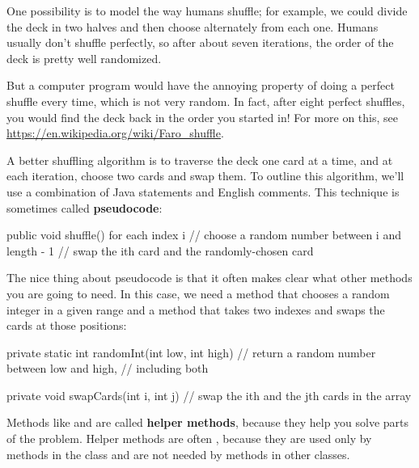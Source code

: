 One possibility is to model the way humans shuffle; for example, we could divide the deck in two halves and then choose alternately from each one.
Humans usually don't shuffle perfectly, so after about seven iterations, the order of the deck is pretty well randomized.

But a computer program would have the annoying property of doing a perfect shuffle every time, which is not very random.
In fact, after eight perfect shuffles, you would find the deck back in the order you started in!
For more on this, see \url{https://en.wikipedia.org/wiki/Faro_shuffle}.


A better shuffling algorithm is to traverse the deck one card at a time, and at each iteration, choose two cards and swap them.
To outline this algorithm, we'll use a combination of Java statements and English comments.
This technique is sometimes called {\bf pseudocode}:


\begin{code}
public void shuffle() {
    for each index i {
        // choose a random number between i and length - 1
        // swap the ith card and the randomly-chosen card
    }
}
\end{code}


The nice thing about pseudocode is that it often makes clear what other methods you are going to need.
In this case, we need a method that chooses a random integer in a given range and a method that takes two indexes and swaps the cards at those positions:

\begin{code}
private static int randomInt(int low, int high) {
    // return a random number between low and high,
    // including both
}

private void swapCards(int i, int j) {
    // swap the ith and the jth cards in the array
}
\end{code}


Methods like  and  are called {\bf helper methods}, because they help you solve parts of the problem.
Helper methods are often , because they are used only by methods in the class and are not needed by methods in other classes.


